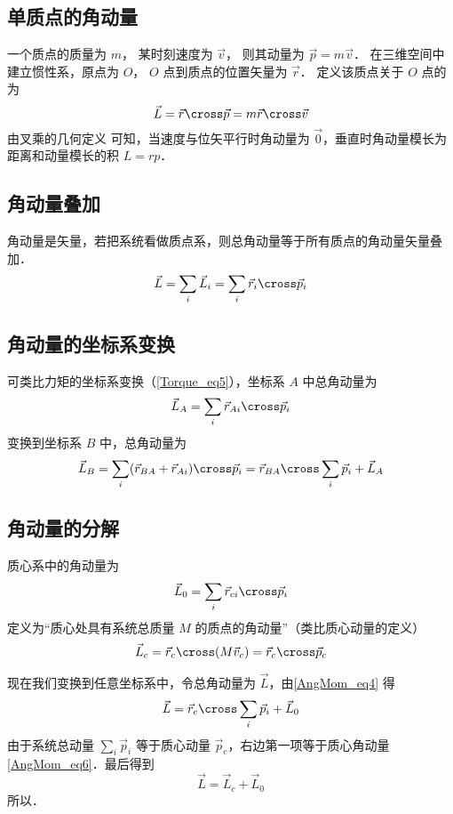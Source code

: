 

\subsection{单质点的角动量}
一个质点的质量为 $m$， 某时刻速度为 $\vec v$， 则其动量为 $\vec p = m\vec v$． 在三维空间中建立惯性系，原点为 $O$， $O$ 点到质点的位置矢量为 $\vec r$． 定义该质点关于 $O$ 点的为
\begin{equation}
\vec L = \vec r \cross \vec p = m\vec r\cross \vec v
\end{equation}
由叉乘的几何定义 可知，当速度与位矢平行时角动量为 $\vec 0$，垂直时角动量模长为距离和动量模长的积 $L = rp$．

\subsection{角动量叠加}
角动量是矢量，若把系统看做质点系，则总角动量等于所有质点的角动量矢量叠加．
\begin{equation}
\vec L = \sum_i \vec L_i = \sum_i \vec r_i \cross\vec p_i
\end{equation}

\subsection{角动量的坐标系变换}
可类比力矩的坐标系变换（\autoref{Torque_eq5}），坐标系 $A$ 中总角动量为
\begin{equation}
\vec L_A = \sum_i \vec r_{Ai} \cross \vec p_i 
\end{equation}
变换到坐标系 $B$ 中，总角动量为
\begin{equation}\label{AngMom_eq4}
\vec L_B = \sum_i (\vec r_{BA} + \vec r_{Ai})\cross \vec p_i = \vec r_{BA}\cross \sum_i \vec p_i + \vec L_A
\end{equation}

\subsection{角动量的分解}
质心系中的角动量为
\begin{equation}\label{AngMom_eq5}
\vec L_0 = \sum_i \vec r_{ci} \cross \vec p_i
\end{equation}
定义为“质心处具有系统总质量 $M$ 的质点的角动量”（类比质心动量的定义）%
\begin{equation}\label{AngMom_eq6}
\vec L_c  = \vec r_c \cross (M \vec v_c) = \vec r_c \cross \vec p_c
\end{equation}

现在我们变换到任意坐标系中，令总角动量为 $\vec L$，由\autoref{AngMom_eq4} 得
\begin{equation}
\vec L = \vec r_{c} \cross \sum_i \vec p_i + \vec L_0
\end{equation}
由于系统总动量 $\sum_i \vec p_i$ 等于质心动量 $\vec p_c$，右边第一项等于质心角动量\autoref{AngMom_eq6}．最后得到
\begin{equation}
\vec L = \vec L_c + \vec L_0
\end{equation}
所以．
